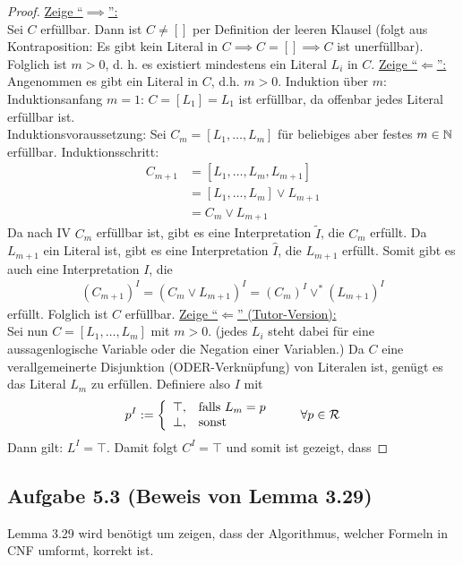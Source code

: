 \begin{proof}
	\underline{Zeige ``$\implies$'':}\\
	Sei $C$ erfüllbar. 
	Dann ist $C\neq[]$ per Definition der leeren Klausel 
	(folgt aus Kontraposition: Es gibt kein Literal in $C\implies C=[]\implies C$ ist unerfüllbar). 	
	Folglich ist $m>0$, d. h. es existiert mindestens ein Literal $L_i$ in $C$.\nl
	\underline{Zeige ``$\Longleftarrow$'':}\\
	Angenommen es gibt ein Literal in $C$, d.h. $m>0$.
	Induktion über $m$:\\
	Induktionsanfang $m=1$: $C=[L_1]=L_1$ ist erfüllbar, da offenbar jedes Literal erfüllbar ist.\\
	Induktionsvoraussetzung: Sei $C_m=[L_1,\ldots,L_m]$ für beliebiges aber festes $m\in\mathbb{N}$ erfüllbar.
	Induktionsschritt: 
	\begin{align*}
		C_{m+1}
		&=[L_1,\ldots,L_m,L_{m+1}]\\
		&=[L_1,\ldots,L_m]\vee L_{m+1}\\
		&= C_{m}\vee L_{m+1}
	\end{align*}
	Da nach IV $C_m$ erfüllbar ist, gibt es eine Interpretation $\tilde{I}$, die $C_m$ erfüllt. 
	Da $L_{m+1}$ ein Literal ist, gibt es eine Interpretation $\hat{I}$, die $L_{m+1}$ erfüllt. 
	Somit gibt es auch eine Interpretation $I$, die 
	\begin{align*}
		(C_{m+1})^I=(C_{m}\vee L_{m+1})^I=(C_{m})^I\vee^\ast (L_{m+1})^I
	\end{align*}
	erfüllt. Folglich ist $C$ erfüllbar.\nl
	\underline{Zeige ``$\Longleftarrow$'' (Tutor-Version):}\\
	Sei nun $C=[L_1,\ldots,L_m]$ mit $m>0$. 
	(jedes $L_i$ steht dabei für eine aussagenlogische Variable oder die Negation einer Variablen.)
	Da $C$ eine verallgemeinerte Disjunktion (ODER-Verknüpfung) von Literalen ist, genügt es das Literal $L_m$ zu erfüllen. 
	Definiere also $I$ mit
	\begin{align*}
		p^I:=\left\lbrace\begin{array}{cl}
			\top,&\text{falls } L_m=p\\		
			\bot,&\text{sonst }
		\end{array}\right.\qquad\forall p\in\mathcal{R}
	\end{align*}
	Dann gilt: $L^I=\top$. Damit folgt $C^I=\top$ und somit ist gezeigt, dass
\end{proof}

\subsection{Aufgabe 5.3 (Beweis von Lemma 3.29)}
Lemma 3.29 wird benötigt um zeigen, dass der Algorithmus, welcher Formeln in CNF umformt, korrekt ist.


